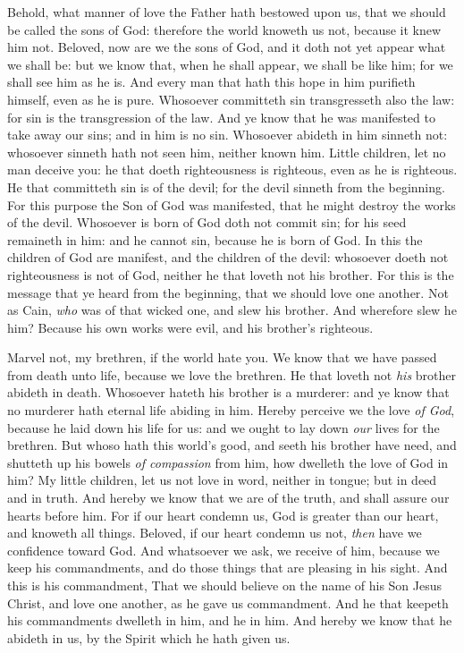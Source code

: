 \documentclass[11pt,letterpaper,oneside]{memoir}
\begin{document}
Behold, what manner of love the Father hath bestowed upon us, that we
should be called the sons of God: therefore the world knoweth us not,
because it knew him not.  Beloved, now are we the sons of God, and it
doth not yet appear what we shall be: but we know that, when he shall
appear, we shall be like him; for we shall see him as he is.  And
every man that hath this hope in him purifieth himself, even as he is
pure.  Whosoever committeth sin transgresseth also the law: for sin is
the transgression of the law.  And ye know that he was manifested to
take away our sins; and in him is no sin.  Whosoever abideth in him
sinneth not: whosoever sinneth hath not seen him, neither known him.
Little children, let no man deceive you: he that doeth righteousness
is righteous, even as he is righteous.  He that committeth sin is of
the devil; for the devil sinneth from the beginning. For this purpose
the Son of God was manifested, that he might destroy the works of the
devil.  Whosoever is born of God doth not commit sin; for his seed
remaineth in him: and he cannot sin, because he is born of God.  In
this the children of God are manifest, and the children of the devil:
whosoever doeth not righteousness is not of God, neither he that
loveth not his brother.  For this is the message that ye heard from
the beginning, that we should love one another.  Not as Cain,
\emph{who} was of that wicked one, and slew his brother. And wherefore
slew he him? Because his own works were evil, and his brother's
righteous.

Marvel not, my brethren, if the world hate you.  We know that we have
passed from death unto life, because we love the brethren. He that
loveth not \emph{his} brother abideth in death.  Whosoever hateth his
brother is a murderer: and ye know that no murderer hath eternal life
abiding in him.  Hereby perceive we the love \emph{of God}, because he
laid down his life for us: and we ought to lay down \emph{our} lives
for the brethren.  But whoso hath this world's good, and seeth his
brother have need, and shutteth up his bowels \emph{of compassion}
from him, how dwelleth the love of God in him?  My little children,
let us not love in word, neither in tongue; but in deed and in truth.
And hereby we know that we are of the truth, and shall assure our
hearts before him.  For if our heart condemn us, God is greater than
our heart, and knoweth all things.  Beloved, if our heart condemn us
not, \emph{then} have we confidence toward God.  And whatsoever we
ask, we receive of him, because we keep his commandments, and do those
things that are pleasing in his sight.  And this is his commandment,
That we should believe on the name of his Son Jesus Christ, and love
one another, as he gave us commandment.  And he that keepeth his
commandments dwelleth in him, and he in him. And hereby we know that
he abideth in us, by the Spirit which he hath given us.
\end{document}
